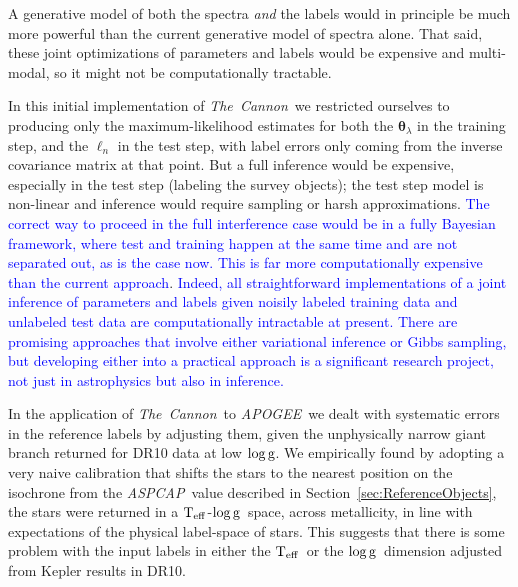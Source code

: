 \documentclass[12pt, preprint]{aastex}
\newcommand{\sectionname}{Section}
\newcommand{\tc}{\textsl{The~Cannon}}
\newcommand{\apogee}{\textsl{APOGEE}}
\newcommand{\aspcap}{\textsl{ASPCAP}}
\newcommand{\set}[1]{\bm{#1}}
\newcommand{\starlabel}{\ell}
\newcommand{\starlabelvec}{\set{\starlabel}}
\newcommand{\teff}{\mbox{$\rm T_{eff}$}}
\newcommand{\logg}{\mbox{$\rm \log g$}}
\begin{document}
A generative model of both the spectra \emph{and} the labels
would in principle be much more powerful than the current generative
model of spectra alone.
That said, these joint optimizations of parameters and labels would be
expensive and multi-modal, so it might not be computationally
tractable.

In this initial implementation of \tc\ we restricted ourselves to producing only the maximum-likelihood estimates for both the $\set{\theta}_\lambda$ in the training step, and the $\starlabelvec_n$
in the test step, with label errors only coming from the inverse covariance matrix at that point.
But a full inference would be expensive, especially in the test step
(labeling the survey objects); the test step model is non-linear and
inference would require sampling or harsh approximations. \textcolor{blue}{The correct way to proceed in the full interference case would be in a fully Bayesian framework, where test and training happen at the same time and are not separated out, as is the case now.  This is far more computationally expensive than the current approach}. \textcolor{blue}{ Indeed, all straightforward implementations of a joint inference of parameters and labels given noisily labeled training data and unlabeled test data are computationally intractable at present.  There are promising approaches that involve either variational inference or Gibbs sampling, but developing either into a practical approach is a significant research project, not just in astrophysics but also in inference. }

In the application of \tc\ to \apogee\ we dealt with systematic errors in the reference
labels by adjusting them,  given the unphysically narrow giant branch returned for DR10 data at low \logg.  We empirically found by adopting a very naive calibration that shifts the stars to the nearest position on the isochrone from the \aspcap\ value described in \sectionname~\ref{sec:ReferenceObjects}, the stars were returned in a \teff-\logg\ space, across metallicity, in line with expectations of the physical label-space of stars. This suggests that there is some problem with the input labels in either the \teff\ or the \logg\ dimension adjusted from Kepler results in DR10. 
\end{document}
